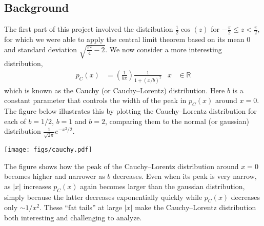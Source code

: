\documentclass[12 pt]{article} %
\newcommand{\Rbb}{\ensuremath{\mathbb R} }
\begin{document}
\subsection*{Background}
The first part of this project involved the distribution $\frac{1}{2}\cos(z)$ for $-\frac{\pi}{2} \leq z < \frac{\pi}{2}$, for which we were able to apply the central limit theorem based on its mean $0$ and standard deviation $\sqrt{\frac{\pi^2}{4} - 2}$.
We now consider a more interesting distribution,
\begin{align}
  \label{eq:cauchy}
  p_C(x) & = \left(\frac{1}{b \pi}\right) \frac{1}{1 + (x / b)^2} &
  x & \in \Rbb
\end{align}
which is known as the Cauchy (or Cauchy--Lorentz) distribution.
Here $b$ is a constant parameter that controls the width of the peak in $p_C(x)$ around $x = 0$.
The figure below illustrates this by plotting the Cauchy--Lorentz distribution for each of $b = 1 / 2$, $b = 1$ and $b = 2$, comparing them to the normal (or gaussian) distribution $\displaystyle \frac{1}{\sqrt{2\pi}} e^{-x^2 / 2}$.

\begin{center}\texttt{[image: figs/cauchy.pdf]}\end{center}

The figure shows how the peak of the Cauchy--Lorentz distribution around $x = 0$ becomes higher and narrower as $b$ decreases.
Even when its peak is very narrow, as $|x|$ increases $p_C(x)$ again becomes larger than the gaussian distribution, simply because the latter decreases exponentially quickly while $p_C(x)$ decreases only $\sim 1 / x^2$.
These ``fat tails'' at large $|x|$ make the Cauchy--Lorentz distribution both interesting and challenging to analyze.
\end{document}
